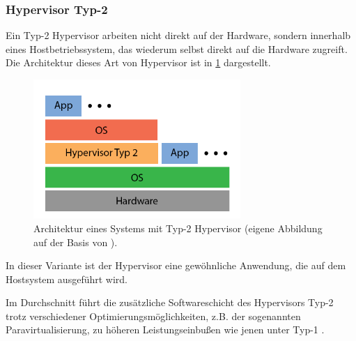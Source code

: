 \documentclass[../main.tex]{subfiles}
\begin{document}

			\subsubsection{Hypervisor Typ-2}
				Ein Typ-2 Hypervisor arbeiten nicht direkt auf der Hardware, sondern innerhalb eines Hostbetriebssystem, das wiederum selbst direkt auf die Hardware zugreift. Die Architektur dieses Art von Hypervisor ist in \fig \ref{fig:intro_hypervisor2} dargestellt.

				\begin{figure}[h]
	          \centering
	          \includegraphics[width=0.7\textwidth]{./images/intro_hypervisor2.png}
	          \caption{Architektur eines Systems mit Typ-2 Hypervisor (eigene Abbildung auf der Basis von \cite[S.107]{tanenbaumOS}).}
	          \label{fig:intro_hypervisor2}
	      \end{figure}

				In dieser Variante ist der Hypervisor eine gewöhnliche Anwendung, die auf dem Hostsystem ausgeführt wird.


				Im Durchschnitt führt die zusätzliche Softwareschicht des Hypervisors Typ-2 trotz verschiedener Optimierungsmöglichkeiten, z.B. der sogenannten Paravirtualisierung, zu höheren Leistungseinbußen wie jenen unter Typ-1 \cite[S.666f.]{tanenbaumOS}.
\end{document}
